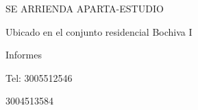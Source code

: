 \documentclass[final]{beamer}
\date{Jul. 31th, 2007}
\begin{document}
  \begin{frame}{}
\centering
  \begin{block}
  \centering
      {\VeryHuge \begin{center}
      SE ARRIENDA APARTA-ESTUDIO
      \end{center}}\par
      {\large \begin{center}
      Ubicado en el conjunto residencial Bochiva I
      \end{center}}\par
      {\Large \begin{center}
      Informes
      \end{center}}\par
      {\large \begin{center}
      Tel: 3005512546
      \end{center}}\par
      {\large \begin{center}
      \hspace*{48pt} 3004513584
      \end{center}}\par  
  \end{block}
  \end{frame}
\end{document}
